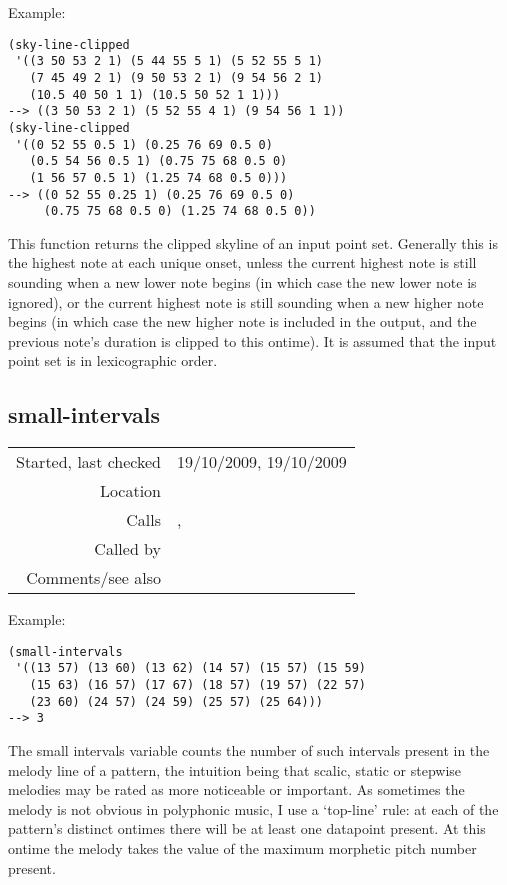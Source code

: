 \vspace{0.5cm}
\noindent Example:
\begin{verbatim}
(sky-line-clipped
 '((3 50 53 2 1) (5 44 55 5 1) (5 52 55 5 1)
   (7 45 49 2 1) (9 50 53 2 1) (9 54 56 2 1)
   (10.5 40 50 1 1) (10.5 50 52 1 1)))
--> ((3 50 53 2 1) (5 52 55 4 1) (9 54 56 1 1))
(sky-line-clipped
 '((0 52 55 0.5 1) (0.25 76 69 0.5 0)
   (0.5 54 56 0.5 1) (0.75 75 68 0.5 0)
   (1 56 57 0.5 1) (1.25 74 68 0.5 0)))
--> ((0 52 55 0.25 1) (0.25 76 69 0.5 0)
     (0.75 75 68 0.5 0) (1.25 74 68 0.5 0))
\end{verbatim}

\noindent This function returns the clipped skyline of
an input point set. Generally this is the highest note
at each unique onset, unless the current highest note
is still sounding when a new lower note begins (in
which case the new lower note is ignored), or the
current highest note is still sounding when a new
higher note begins (in which case the new higher note
is included in the output, and the previous note's
duration is clipped to this ontime). It is assumed
that the input point set is in lexicographic order.


\subsection*{small-intervals}\label{fun:small-intervals}

\vspace{0.3cm}
\begin{tabular}{r|p{8cm}}
Started, last checked & 19/10/2009, 19/10/2009 \\
Location & \nameref{sec:musical-properties} \\
Calls & \nameref{fun:spacing-items}, \nameref{fun:top-line} \\
Called by & \\
Comments/see also & \nameref{fun:intervallic-leaps}
\end{tabular}

\vspace{0.5cm}
\noindent Example:
\begin{verbatim}
(small-intervals
 '((13 57) (13 60) (13 62) (14 57) (15 57) (15 59)
   (15 63) (16 57) (17 67) (18 57) (19 57) (22 57)
   (23 60) (24 57) (24 59) (25 57) (25 64)))
--> 3
\end{verbatim}

\noindent The small intervals variable counts the
number of such intervals present in the melody line of
a pattern, the intuition being that scalic, static or
stepwise melodies may be rated as more noticeable or
important. As sometimes the melody is not obvious in
polyphonic music, I use a `top-line' rule: at each of
the pattern's distinct ontimes there will be at least
one datapoint present. At this ontime the melody takes
the value of the maximum morphetic pitch number
present.


